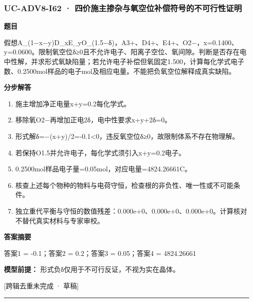 \documentclass[UTF8,11pt,a4paper]{ctexart}
\begin{document}
\subsubsection*{UC-ADV8-I62 · 四价施主掺杂与氧空位补偿符号的不可行性证明}
\noindent\textbf{题目}\par
假想A\_(1−x−y)D\_xE\_yO\_(1.5−δ)，A3+、D4+、E4+、O2−，x=0.1400、y=0.0600。限制氧空位δ≥0且不允许电子、阳离子空位、氧间隙。判断是否存在电中性解，并求形式氧缺陷量；若允许电子补偿但氧固定1.500，计算每化学式电子数、0.2500mol样品的电子mol及相应电量。不能把负氧空位解释成真实缺陷。\par
\medskip\noindent\textbf{分步解答}
\begin{enumerate}
\item 施主增加净正电量x+y=0.2每化学式。
\item 移除氧O2−再增加正电2δ，电中性要求x+y+2δ=0。
\item 形式解δ=−(x+y)/2=-0.1<0，违反氧空位δ≥0，故限制体系不存在物理解。
\item 若保持O1.5并允许电子，每化学式须引入x+y=0.2电子。
\item 0.2500mol样品电子量=0.05mol，对应电量=4824.26661C。
\item 核查上述每个物种的物料与电荷守恒，检查根的非负性、唯一性或不可能条件。
\item 独立重代平衡与守恒的数值残差：0.000e+0、0.000e+0、0.000e+0。计算核对不替代真实材料与专家审校。
\end{enumerate}
\noindent\textbf{答案摘要}\par
答案1 = -0.1；答案2 = 0.2；答案3 = 0.05；答案4 = 4824.26661\par
\noindent\textbf{模型前提：}
形式负δ仅用于不可行反证，不视为实在晶体。\par
\noindent\textcolor{red!65!black}{[跨辑去重未完成 · 草稿]} \par
\medskip\hrule\medskip
{}
\end{document}
